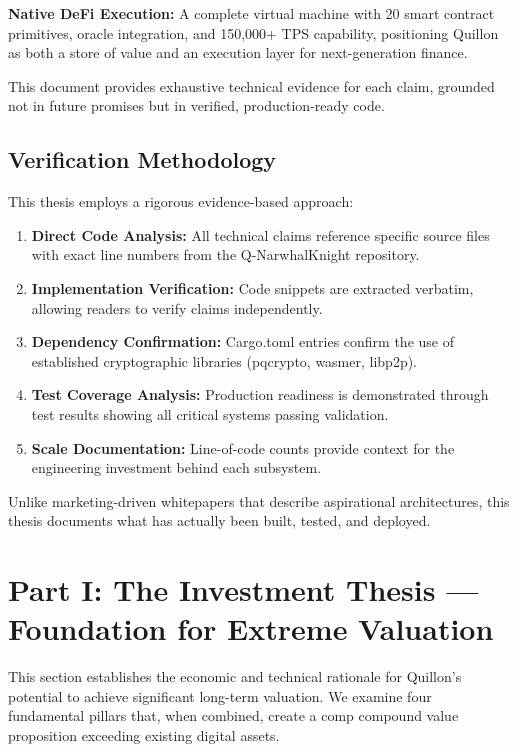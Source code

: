 \documentclass[11pt,a4paper]{article}
\begin{document}
\textbf{Native DeFi Execution:} A complete virtual machine with 20 smart contract primitives, oracle integration, and 150,000+ TPS capability, positioning Quillon as both a store of value and an execution layer for next-generation finance.

This document provides exhaustive technical evidence for each claim, grounded not in future promises but in verified, production-ready code.

\subsection{Verification Methodology}

This thesis employs a rigorous evidence-based approach:

\begin{enumerate}[leftmargin=*]
\item \textbf{Direct Code Analysis:} All technical claims reference specific source files with exact line numbers from the Q-NarwhalKnight repository.

\item \textbf{Implementation Verification:} Code snippets are extracted verbatim, allowing readers to verify claims independently.

\item \textbf{Dependency Confirmation:} Cargo.toml entries confirm the use of established cryptographic libraries (pqcrypto, wasmer, libp2p).

\item \textbf{Test Coverage Analysis:} Production readiness is demonstrated through test results showing all critical systems passing validation.

\item \textbf{Scale Documentation:} Line-of-code counts provide context for the engineering investment behind each subsystem.
\end{enumerate}

Unlike marketing-driven whitepapers that describe aspirational architectures, this thesis documents what has actually been built, tested, and deployed.

\newpage
\section{Part I: The Investment Thesis — Foundation for Extreme Valuation}

This section establishes the economic and technical rationale for Quillon's potential to achieve significant long-term valuation. We examine four fundamental pillars that, when combined, create a comp compound value proposition exceeding existing digital assets.
\end{document}
